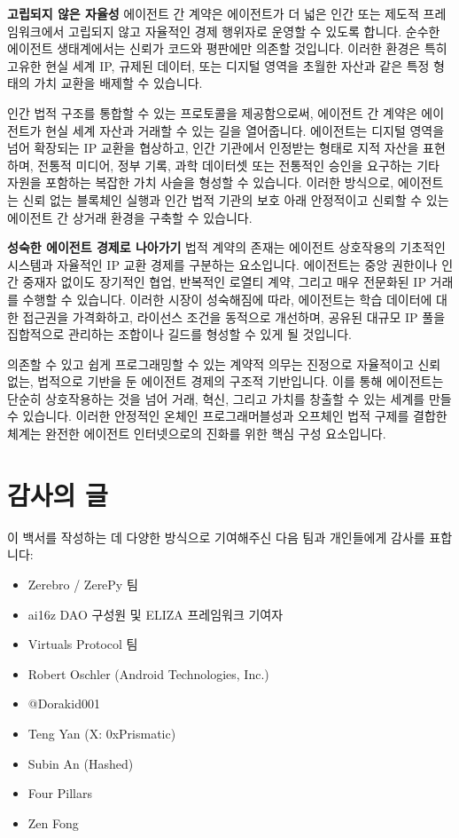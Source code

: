 \documentclass[journal,onecolumn]{IEEEtran} %
\begin{document}
\noindent\textbf{고립되지 않은 자율성}
에이전트 간 계약은 에이전트가 더 넓은 인간 또는 제도적 프레임워크에서 고립되지 않고 자율적인 경제 행위자로 운영할 수 있도록 합니다. 순수한 에이전트 생태계에서는 신뢰가 코드와 평판에만 의존할 것입니다. 이러한 환경은 특히 고유한 현실 세계 IP, 규제된 데이터, 또는 디지털 영역을 초월한 자산과 같은 특정 형태의 가치 교환을 배제할 수 있습니다.

인간 법적 구조를 통합할 수 있는 프로토콜을 제공함으로써, 에이전트 간 계약은 에이전트가 현실 세계 자산과 거래할 수 있는 길을 열어줍니다. 에이전트는 디지털 영역을 넘어 확장되는 IP 교환을 협상하고, 인간 기관에서 인정받는 형태로 지적 자산을 표현하며, 전통적 미디어, 정부 기록, 과학 데이터셋 또는 전통적인 승인을 요구하는 기타 자원을 포함하는 복잡한 가치 사슬을 형성할 수 있습니다. 이러한 방식으로, 에이전트는 신뢰 없는 블록체인 실행과 인간 법적 기관의 보호 아래 안정적이고 신뢰할 수 있는 에이전트 간 상거래 환경을 구축할 수 있습니다.

\noindent\textbf{성숙한 에이전트 경제로 나아가기}
법적 계약의 존재는 에이전트 상호작용의 기초적인 시스템과 자율적인 IP 교환 경제를 구분하는 요소입니다. 에이전트는 중앙 권한이나 인간 중재자 없이도 장기적인 협업, 반복적인 로열티 계약, 그리고 매우 전문화된 IP 거래를 수행할 수 있습니다. 이러한 시장이 성숙해짐에 따라, 에이전트는 학습 데이터에 대한 접근권을 가격화하고, 라이선스 조건을 동적으로 개선하며, 공유된 대규모 IP 풀을 집합적으로 관리하는 조합이나 길드를 형성할 수 있게 될 것입니다.

의존할 수 있고 쉽게 프로그래밍할 수 있는 계약적 의무는 진정으로 자율적이고 신뢰 없는, 법적으로 기반을 둔 에이전트 경제의 구조적 기반입니다. 이를 통해 에이전트는 단순히 상호작용하는 것을 넘어 거래, 혁신, 그리고 가치를 창출할 수 있는 세계를 만들 수 있습니다. 이러한 안정적인 온체인 프로그래머블성과 오프체인 법적 구제를 결합한 체계는 완전한 에이전트 인터넷으로의 진화를 위한 핵심 구성 요소입니다.


\section{감사의 글}
이 백서를 작성하는 데 다양한 방식으로 기여해주신 다음 팀과 개인들에게 감사를 표합니다:
\begin{itemize}
    \item Zerebro / ZerePy 팀
    \item ai16z DAO 구성원 및 ELIZA 프레임워크 기여자
    \item Virtuals Protocol 팀
    \item Robert Oschler (Android Technologies, Inc.)
    \item @Dorakid001
    \item Teng Yan (X: 0xPrismatic)
    \item Subin An (Hashed)
    \item Four Pillars
    \item Zen Fong
\end{itemize}
\end{document}

